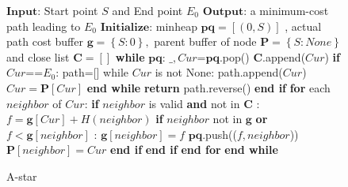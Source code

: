 \documentclass[lettersize,journal]{IEEEtran}
\begin{document}
\begin{figure}[!t]
\begin{algorithm}[H]
\caption{A-star}\label{alg:alg1}
\begin{algorithmic}[1]
\STATE $\textbf{Input: }$Start point $S$ and End point $E_0$
\STATE $\textbf{Output: }$a minimum-cost path leading to $E_0$
\STATE $\textbf{Initialize:}$  minheap $\mathbf{pq}= [(0,S)] $ ,
actual path cost buffer $\mathbf{g}=\left\{ {S:0} \right\},
$ parent buffer of node $\mathbf{P}=\left\{ S:None \right\}$  
and close list $\mathbf{C}=\left[  \right]$
\STATE \textbf{while} $\mathbf{pq}$: %
\STATE \hspace{0.5cm} $\_, Cur$=$\mathbf{pq}$.pop()
\STATE \hspace{0.5cm} $\mathbf{C}$.append($Cur$)
\STATE \hspace{0.5cm} \textbf{if} $Cur$==$E_0$: %
\STATE \hspace{1.0cm} path=[]
\STATE \hspace{1.0cm} while $Cur$ is not None: %
\STATE \hspace{1.5cm} path.append($Cur$)
\STATE \hspace{1.5cm} $Cur=\mathbf{P}[Cur]$
\STATE \hspace{1.0cm} \textbf{end while} %
\STATE \hspace{1.0cm} \textbf{return} path.reverse() %
\STATE \hspace{0.5cm} \textbf{end if} %
\STATE \hspace{0.5cm} \textbf{for} each $neighbor$ of $Cur$: %
\STATE \hspace{1.0cm} \textbf{if} $neighbor$ is valid \textbf{and} not in $\mathbf{C}$ : %
\STATE \hspace{1.5cm} $f=\mathbf{g}[Cur]+H(neighbor)$ 
\STATE \hspace{1.5cm} \textbf{if} $neighbor$ not in $\mathbf{g}$ \textbf{or }$f<\mathbf{g}[neighbor]$ : %
\STATE \hspace{2.0cm} $\mathbf{g}[neighbor]=f$
\STATE \hspace{2.0cm} $\mathbf{pq}$.push(($f,neighbor$))
\STATE \hspace{2.0cm} $\mathbf{P}[neighbor]=Cur$
\STATE \hspace{1.5cm} \textbf{end if} %
\STATE \hspace{1.0cm} \textbf{end if} %
\STATE \hspace{0.5cm} \textbf{end for} %
\STATE \textbf{end while} %
\end{algorithmic}
\end{algorithm}

\end{figure}
\end{document}
